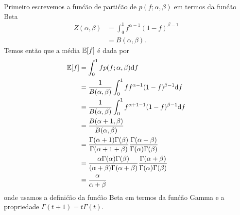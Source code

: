 \begin{exenumerate}
    \begin{solution}
        Primeiro escrevemos a fun\'c\~ao de parti\'c\~ao de $p(f; \alpha, \beta)$ em termos da fun\'c\~ao Beta
        \begin{align}
            Z(\alpha, \beta) &= \int_0^1 f^{\alpha-1} (1-f)^{\beta-1}\\
            & =  B(\alpha, \beta).
        \end{align}
        Temos ent\~ao que a m\'edia $\mathbb{E}[f]$ \'e dada por
        \begin{align}
            \mathbb{E}[f] & = \int_0^1 f p(f; \alpha, \beta) \mathrm{d} f \\
            & = \frac{1}{B(\alpha, \beta)} \int_0^1 f  f^{\alpha-1} (1-f)^{\beta-1} \mathrm{d} f\\
            & = \frac{1}{B(\alpha, \beta)} \int_0^1 f^{\alpha+1-1} (1-f)^{\beta-1} \mathrm{d} f\\
            & = \frac{B(\alpha+1, \beta)}{B(\alpha, \beta)} \\
            & = \frac{\Gamma(\alpha+1)\Gamma(\beta)}{\Gamma(\alpha+1+\beta)} \frac{\Gamma(\alpha+\beta)}{\Gamma(\alpha)\Gamma(\beta)}\\
            & = \frac{\alpha \Gamma(\alpha)\Gamma(\beta)}{(\alpha+\beta) \Gamma(\alpha+\beta)} \frac{\Gamma(\alpha+\beta)}{\Gamma(\alpha)\Gamma(\beta)}\\
            & = \frac{\alpha}{\alpha+\beta}
            \label{eq:mean-beta-var-alt}
        \end{align}
        onde usamos a defini\'c\~ao da fun\'c\~ao Beta em termos da fun\'c\~ao Gamma e a propriedade $\Gamma(t+1) = t \Gamma(t)$.
    \end{solution}
    

\end{exenumerate}
